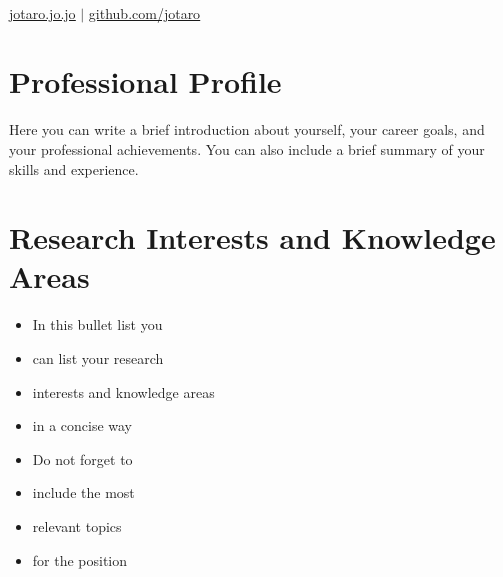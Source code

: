 \documentclass[11pt,a4paper]{article}
\begin{document}
\begin{center}
     \\ \vspace{5pt}
    
    
    \href{https://jotaro.jo.jo}{\underline{jotaro.jo.jo}} $|$
    \href{https://github.com/jotaro}{\underline{github.com/jotaro}}
\end{center}

\section{Professional Profile}

Here you can write a brief introduction about yourself, your career goals, and your professional achievements. You can also include a brief summary of your skills and experience.

\section{Research Interests and Knowledge Areas}

\begin{minipage}{.5\textwidth}%
    \begin{itemize}[noitemsep]
        \item In this bullet list you
        \item can list your research
        \item interests and knowledge areas
        \item in a concise way
    \end{itemize}
\end{minipage}%
\begin{minipage}{.5\textwidth}%
    \begin{itemize}[noitemsep]
        \item Do not forget to
        \item include the most
        \item relevant topics
        \item for the position
    \end{itemize}
\end{minipage}
\end{document}
